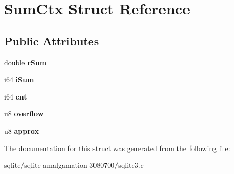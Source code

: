 \hypertarget{struct_sum_ctx}{\section{Sum\+Ctx Struct Reference}
\label{struct_sum_ctx}
}
\subsection*{Public Attributes}
\begin{DoxyCompactItemize}
\item 
\hypertarget{struct_sum_ctx_a1774080b9bcada2f4e867eaf40763f41}{double {\bfseries r\+Sum}}\label{struct_sum_ctx_a1774080b9bcada2f4e867eaf40763f41}

\item 
\hypertarget{struct_sum_ctx_ace6196fb30ebc0687997a723d55683db}{i64 {\bfseries i\+Sum}}\label{struct_sum_ctx_ace6196fb30ebc0687997a723d55683db}

\item 
\hypertarget{struct_sum_ctx_ada00261fe604a7cc6719fdcd8bb5914c}{i64 {\bfseries cnt}}\label{struct_sum_ctx_ada00261fe604a7cc6719fdcd8bb5914c}

\item 
\hypertarget{struct_sum_ctx_a3b14a5da00584aff08314d5e9ddbe9ea}{u8 {\bfseries overflow}}\label{struct_sum_ctx_a3b14a5da00584aff08314d5e9ddbe9ea}

\item 
\hypertarget{struct_sum_ctx_a035a2a22271fee066d9a92d12fe3b9a5}{u8 {\bfseries approx}}\label{struct_sum_ctx_a035a2a22271fee066d9a92d12fe3b9a5}

\end{DoxyCompactItemize}


The documentation for this struct was generated from the following file\+:\begin{DoxyCompactItemize}
\item 
sqlite/sqlite-\/amalgamation-\/3080700/sqlite3.\+c\end{DoxyCompactItemize}
